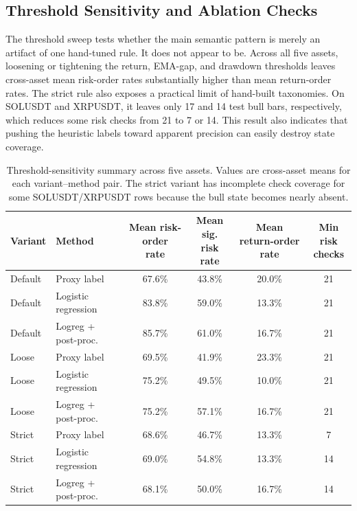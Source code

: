 \documentclass[a4paper,fleqn]{cas-dc}
\begin{document}
\subsection{Threshold Sensitivity and Ablation Checks}
The threshold sweep tests whether the main semantic pattern is merely an artifact of one hand-tuned rule. It does not appear to be. Across all five assets, loosening or tightening the return, EMA-gap, and drawdown thresholds leaves cross-asset mean risk-order rates substantially higher than mean return-order rates. The strict rule also exposes a practical limit of hand-built taxonomies. On SOLUSDT and XRPUSDT, it leaves only 17 and 14 test bull bars, respectively, which reduces some risk checks from 21 to 7 or 14. This result also indicates that pushing the heuristic labels toward apparent precision can easily destroy state coverage.

\begin{table}[t]
\caption{Threshold-sensitivity summary across five assets. Values are cross-asset means for each variant--method pair. The strict variant has incomplete check coverage for some SOLUSDT/XRPUSDT rows because the bull state becomes nearly absent.}
\label{tab:threshold-sensitivity}
\centering
\scriptsize
\setlength{\tabcolsep}{4pt}
\begin{tabular}{llcccc}
\toprule
Variant & Method & \shortstack{Mean risk-order\\rate} & \shortstack{Mean sig.\\risk rate} & \shortstack{Mean return-order\\rate} & \shortstack{Min risk\\checks} \\
\midrule
Default & Proxy label & 67.6\% & 43.8\% & 20.0\% & 21 \\
Default & Logistic regression & 83.8\% & 59.0\% & 13.3\% & 21 \\
Default & Logreg + post-proc. & 85.7\% & 61.0\% & 16.7\% & 21 \\
\midrule
Loose & Proxy label & 69.5\% & 41.9\% & 23.3\% & 21 \\
Loose & Logistic regression & 75.2\% & 49.5\% & 10.0\% & 21 \\
Loose & Logreg + post-proc. & 75.2\% & 57.1\% & 16.7\% & 21 \\
\midrule
Strict & Proxy label & 68.6\% & 46.7\% & 13.3\% & 7 \\
Strict & Logistic regression & 69.0\% & 54.8\% & 13.3\% & 14 \\
Strict & Logreg + post-proc. & 68.1\% & 50.0\% & 16.7\% & 14 \\
\bottomrule
\end{tabular}
\end{table}
\end{document}
